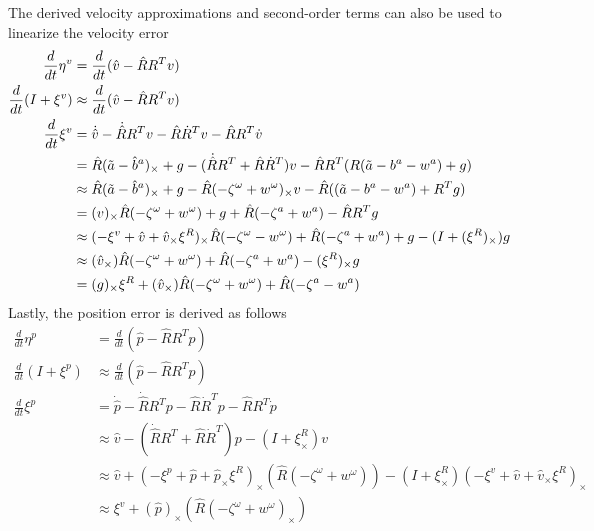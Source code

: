 The derived velocity approximations and second-order terms can also be used to linearize the velocity error
\begin{equation}
    \begin{split}
        \frac{d}{dt} \eta^v &= \frac{d}{dt} (\hat{v} - \hat{R} R^T v) \\
        \frac{d}{dt} (I + \xi^v) &\approx \frac{d}{dt} (\hat{v} - \hat{R} R^T v) \\
        \frac{d}{dt} \xi^v &= \dot{\hat{v}} - \dot{\hat{R}}R^Tv - \hat{R} \dot{R}^T v - \hat{R} R^T \dot{v}\\
        &= \hat{R} (\Tilde{a} - \hat{b}^a)_{\times} + g -
            (\dot{\hat{R}}R^T + \hat{R} \dot{R}^T)v -
            \hat{R} R^T (R (\Tilde{a} - b^a - w^a) + g) \\
        &\approx \hat{R} (\Tilde{a} - \hat{b}^a)_{\times} + g -
            \hat{R} (-\zeta^{\omega} + w^{\omega})_{\times} v -
            \hat{R}((\Tilde{a} - b^a - w^a) + R^T g) \\
        &= (v)_{\times} \hat{R} (-\zeta^{\omega} + w^{\omega}) + g +
            \hat{R} (-\zeta^{a} + w^{a}) -
            \hat{R} R^T g \\
        &\approx  (-\xi^v + \hat{v} + \hat{v}_{\times} \xi^R)_{\times} \hat{R} (-\zeta^{\omega} - w^{\omega}) +
            \hat{R} (-\zeta^{a} + w^{a}) + g -
            (I + (\xi^R)_{\times})g \\
        &\approx (\hat{v}_{\times}) \hat{R} (-\zeta^{\omega} + w^{\omega}) +
            \hat{R} (-\zeta^{a} + w^{a}) -
            (\xi^R)_{\times} g \\
        &= (g)_{\times} \xi^R + 
            (\hat{v}_{\times}) \hat{R} (-\zeta^{\omega} + w^{\omega}) +
              \hat{R} (-\zeta^{a} - w^{a})
        \label{eq: v linearized RInEKF}
    \end{split}
\end{equation}
Lastly, the position error is derived as follows
\begin{equation}
    \begin{split}
        \frac{d}{dt} \eta^p &= \frac{d}{dt} (\hat{p} - \hat{R} R^T p) \\
        \frac{d}{dt} (I + \xi^p) &\approx \frac{d}{dt} (\hat{p} - \hat{R} R^T p) \\
        \frac{d}{dt} \xi^p &= \dot{\hat{p}} - \dot{\hat{R}}R^Tp - \hat{R} \dot{R}^T p - \hat{R} R^T \dot{p}\\
        &\approx \hat{v} - (\dot{\hat{R}}R^T + \hat{R} \dot{R}^T)p - (I +\xi^R_{\times})v\\
        &\approx \hat{v} + (-\xi^p + \hat{p} + \hat{p}_{\times} \xi^R)_{\times} (\hat{R} (-\zeta^{\omega} + w^{\omega}))  - (I +\xi^R_{\times}) (-\xi^v + \hat{v} + \hat{v}_{\times} \xi^R)_{\times}\\
        &\approx \xi^v + (\hat{p})_{\times} (\hat{R} (-\zeta^{\omega} + w^{\omega})_{\times})
    \end{split}
    \label{eq: p linearized RInEKF}
\end{equation}

